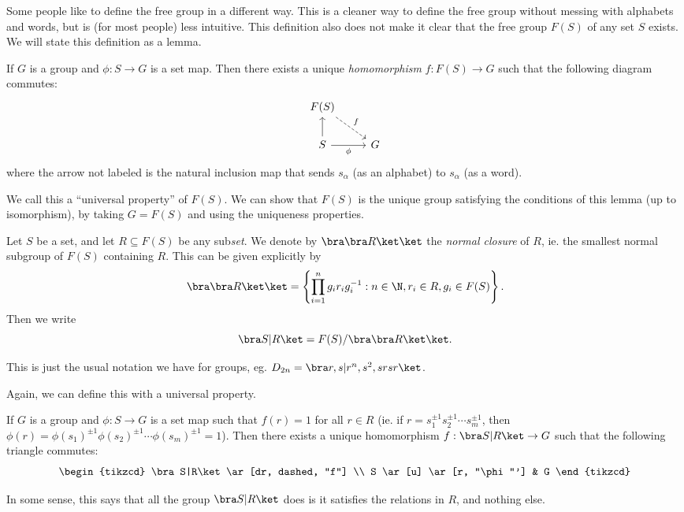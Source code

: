\documentclass[a4paper]{article}
\begin{document}
Some people like to define the free group in a different way. This is a cleaner way to define the free group without messing with alphabets and words, but is (for most people) less intuitive. This definition also does not make it clear that the free group $F(S)$ of any set $S$ exists. We will state this definition as a lemma.
\begin{lemma}
  If $G$ is a group and $\phi: S\to G$ is a set map. Then there exists a unique \emph{homomorphism} $f: F(S) \to G$ such that the following diagram commutes:
  \[
    \begin{tikzcd}
      F(S) \ar[dr, dashed, "f"] \\
      S \ar[u] \ar[r, "\phi"'] & G
    \end{tikzcd}
  \]
  where the arrow not labeled is the natural inclusion map that sends $s_\alpha$ (as an alphabet) to $s_\alpha$ (as a word).
\end{lemma}
We call this a ``universal property'' of $F(S)$. We can show that $F(S)$ is the unique group satisfying the conditions of this lemma (up to isomorphism), by taking $G = F(S)$ and using the uniqueness properties.

\begin{defi}
  Let $S$ be a set, and let $R \subseteq F(S)$ be any sub\emph{set}. We denote by $\bra \bra R\ket\ket$ the \emph{normal closure} of $R$, ie. the smallest normal subgroup of $F(S)$ containing $R$. This can be given explicitly by
  \[
    \bra \bra R\ket \ket = \left\{\prod_{i = 1}^n g_i r_i g_i^{-1}: n \in \N, r_i \in R, g_i \in F(S)\right\}.
  \]
  Then we write
  \[
    \bra S | R\ket = F(S)/\bra\bra R\ket\ket.
  \]
\end{defi}
This is just the usual notation we have for groups, eg. $D_{2n} = \bra r, s | r^n, s^2, srsr\ket$.

Again, we can define this with a universal property.
\begin{lemma}
  If $G$ is a group and $\phi: S \to G$ is a set map such that $f(r) = 1$ for all $r \in R$ (ie. if $r = s_1^{\pm 1}s_2^{\pm 1}\cdots s_m^{\pm 1}$, then $\phi(r) = \phi(s_1)^{\pm 1}\phi(s_2)^{\pm 1} \cdots \phi(s_m)^{\pm 1} = 1$). Then there exists a unique homomorphism $f: \bra S | R\ket \to G$ such that the following triangle commutes:
  \[
    \begin{tikzcd}
      \bra S|R\ket \ar[dr, dashed, "f"] \\
      S \ar[u] \ar[r, "\phi"'] & G
    \end{tikzcd}
  \]
\end{lemma}
In some sense, this says that all the group $\bra S|R \ket$ does is it satisfies the relations in $R$, and nothing else.
\end{document}

